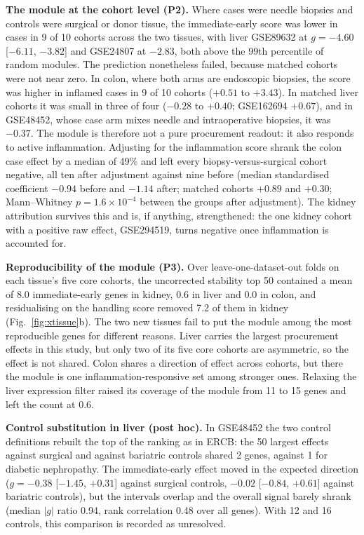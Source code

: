 \documentclass[pdflatex,sn-vancouver-num]{sn-jnl}
\theoremstyle{thmstyleone}
\theoremstyle{thmstyletwo}
\theoremstyle{thmstylethree}
\begin{document}
\textbf{The module at the cohort level (P2).} Where cases were needle biopsies and controls were
surgical or donor tissue, the immediate-early score was lower in cases in 9 of 10 cohorts across
the two tissues, with liver GSE89632 at $g = -4.60$ [$-6.11$, $-3.82$] and GSE24807 at
$-2.83$, both above the 99th percentile of random modules. The prediction nonetheless failed,
because matched cohorts were not near zero. In colon, where both arms are endoscopic biopsies,
the score was higher in inflamed cases in 9 of 10 cohorts ($+0.51$ to $+3.43$). In matched
liver cohorts it was small in three of four ($-0.28$ to $+0.40$; GSE162694 $+0.67$), and in
GSE48452, whose case arm mixes needle and intraoperative biopsies, it was $-0.37$. The module is
therefore not a pure procurement readout: it also responds to active inflammation. Adjusting for
the inflammation score shrank the colon case effect by a median of 49\% and left every
biopsy-versus-surgical cohort negative, all ten after adjustment against nine before (median
standardised coefficient $-0.94$ before and $-1.14$ after; matched cohorts $+0.89$ and
$+0.30$; Mann--Whitney $p = 1.6 \times 10^{-4}$ between the groups after adjustment). The
kidney attribution survives this and is, if anything, strengthened: the one kidney cohort with a
positive raw effect, GSE294519, turns negative once inflammation is accounted for.

\textbf{Reproducibility of the module (P3).} Over leave-one-dataset-out folds on each tissue's
five core cohorts, the uncorrected stability top 50 contained a mean of 8.0 immediate-early
genes in kidney, 0.6 in liver and 0.0 in colon, and residualising on the handling score removed
7.2 of them in kidney (Fig.~\ref{fig:xtissue}b). The two new tissues fail to put the module among
the most reproducible genes for different reasons. Liver carries the largest procurement effects
in this study, but only two of its five core cohorts are asymmetric, so the effect is not
shared. Colon shares a direction of effect across cohorts, but there the module is one
inflammation-responsive set among stronger ones. Relaxing the liver expression filter raised its
coverage of the module from 11 to 15 genes and left the count at 0.6.

\textbf{Control substitution in liver (post hoc).} In GSE48452 the two control definitions
rebuilt the top of the ranking as in ERCB: the 50 largest effects against surgical and against
bariatric controls shared 2 genes, against 1 for diabetic nephropathy. The immediate-early
effect moved in the expected direction ($g = -0.38$ [$-1.45$, $+0.31$] against surgical
controls, $-0.02$ [$-0.84$, $+0.61$] against bariatric controls), but the intervals overlap and
the overall signal barely shrank (median $|g|$ ratio 0.94, rank correlation 0.48 over all
genes). With 12 and 16 controls, this comparison is recorded as unresolved.
\end{document}
